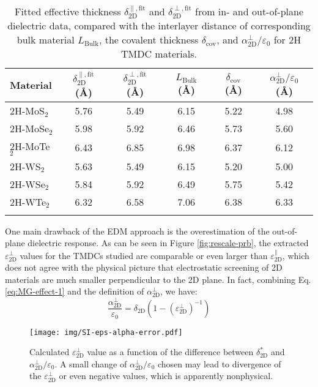 \documentclass[manuscript=suppinfo,email=true,hyperref=true,keywords=false]{achemso}
\begin{document}
\begin{table}[htbp]
  \centering
  \begin{tabular}[htbp]{lccccc}
  \hline{}
  Material & $\delta_{\mathrm{2D}}^{\parallel, \mathrm{fit}}$ (\AA) & $\delta_{\mathrm{2D}}^{\perp, \mathrm{fit}}$ ({\AA})& $L_{\mathrm{Bulk}}$ ({\AA}) & $\delta_{\mathrm{cov}}$ ({\AA}) & $\alpha_{\mathrm{2D}}^{\perp}/\varepsilon_{0}$ ({\AA})\\
  \hline{}
  2H-MoS$_{2}$ & 5.76 & 5.49 & 6.15 & 5.22 & 4.98\\
  2H-MoSe$_{2}$ & 5.98 & 5.92 & 6.46 &  5.73 & 5.60\\
  2H-MoTe$_{2}$ & 6.43 & 6.85 & 6.98 & 6.37 & 6.12\\
  2H-WS$_{2}$ & 5.63 & 5.49 & 6.15 & 5.20 & 5.00\\
  2H-WSe$_{2}$ & 5.84 & 5.92 & 6.49 & 5.75 & 5.42\\
  2H-WTe$_{2}$ & 6.32 & 6.58 & 7.06 & 6.38 & 6.33\\
  \hline{}
\end{tabular}

\caption{Fitted effective thickness
  $\delta_{\mathrm{2D}}^{\parallel, \mathrm{fit}}$ and
  $\delta_{\mathrm{2D}}^{\perp, \mathrm{fit}}$ from in- and
  out-of-plane dielectric data, compared with the interlayer distance
  of corresponding bulk material $L_{\mathrm{Bulk}}$, the covalent
  thickness $\delta_{\mathrm{cov}}$, and
  $\alpha_{\mathrm{2D}}^{\perp}/\varepsilon_{0}$ for 2H TMDC
  materials.}
\label{tab:delta-L-DFt}
\end{table}

One main drawback of the EDM approach is the
overestimation of the out-of-plane dielectric response. As can be seen
in Figure \ref{fig:rescale-prb}, the extracted
$\varepsilon_{\mathrm{2D}}^{\perp}$ values for the TMDCs studied
are comparable or even larger than
$\varepsilon_{\mathrm{2D}}^{\parallel}$, which does not agree with the
physical picture that electrostatic screening of 2D materials are much
smaller perpendicular to the 2D plane. In fact, combining
Eq. \ref{eq:MG-effect-1} and the definition of $\alpha_{\mathrm{2D}}^{\perp}$, we
have:
\begin{equation}
  \label{eq:eps-alpha-perp}
  \frac{\alpha_{\mathrm{2D}}^{\perp}}{\varepsilon_{0}} = \delta_{\mathrm{2D}}(1 - (\varepsilon_{\mathrm{2D}}^{\perp})^{-1})
\end{equation}

\begin{figure}[htbp]
  \centering
  \texttt{[image: img/SI-eps-alpha-error.pdf]}
  \caption{Calculated $\varepsilon_{\mathrm{2D}}^{\perp}$ value as a
    function of the difference between $\delta_{\mathrm{2D}}^{*}$ and
    $\alpha_{\mathrm{2D}}^{\perp}/\varepsilon_{0}$. A small change of
    $\alpha_{\mathrm{2D}}^{\perp}/\varepsilon_{0}$ chosen may lead to divergence of
    the $\varepsilon_{\mathrm{2D}}^{\perp}$ or even negative values,
    which is apparently nonphysical.}
  \label{fig:eps-alpha-error}
\end{figure}
\end{document}
